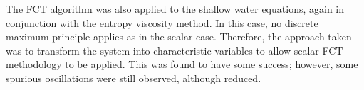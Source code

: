 The FCT algorithm was also applied to the shallow water equations,
again in conjunction with the entropy viscosity method. In this case,
no discrete maximum principle applies as in the scalar case. Therefore,
the approach taken was to transform the system into characteristic variables
to allow scalar FCT methodology to be applied. This was found to have some
success; however, some spurious oscillations were still observed, although
reduced.
